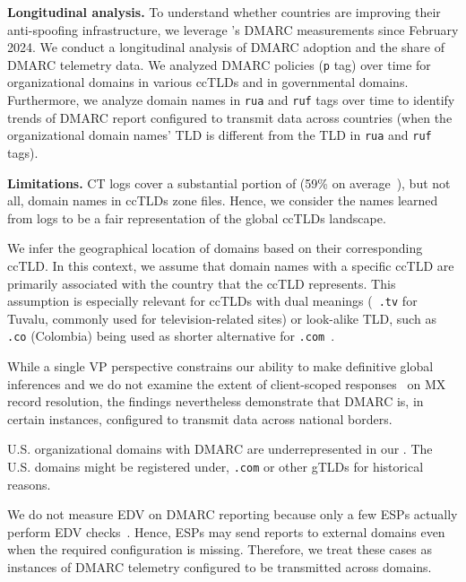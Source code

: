 \textbf{Longitudinal analysis.} To understand whether countries are improving their anti-spoofing infrastructure, we leverage \openintel's \gls{DMARC} measurements since February 2024. We conduct a longitudinal analysis of \gls{DMARC} adoption and the share of \gls{DMARC} telemetry data. We analyzed \gls{DMARC} policies (\texttt{p} tag) over time for organizational domains in various \glspl{ccTLD} and in governmental domains.
Furthermore, we analyze domain names in \texttt{rua} and \texttt{ruf} tags over time to identify trends of \gls{DMARC} report configured to transmit data across countries (when the organizational domain names' \gls{TLD} is different from the \gls{TLD} in \texttt{rua} and \texttt{ruf} tags).

\textbf{Limitations.}
\gls{CT} logs cover a substantial portion of (59\% on average~\cite{SommeseEtAl_ThisLocalDomain_2024a}), but not all, domain names in \glspl{ccTLD} zone files. Hence, we consider the names learned from logs to be a fair representation of the global \glspl{ccTLD} landscape.

We infer the geographical location of domains based on their corresponding \gls{ccTLD}.
In this context, we assume that domain names with a specific \gls{ccTLD} are primarily associated with the country that the \gls{ccTLD} represents. This assumption is especially relevant for \glspl{ccTLD} with dual meanings (\eg~\texttt{.tv} for Tuvalu, commonly used for television-related sites) or look-alike \gls{TLD}, such as \texttt{.co} (Colombia) being used as shorter alternative for \texttt{.com}~\cite{_ManagingMultiRegionalMultilingual_a}.

While a single \gls{VP} perspective constrains our ability to make definitive global inferences and we do not examine the extent of client-scoped responses~\cite{10.1145/3730977} on MX record resolution, the findings nevertheless demonstrate that DMARC is, in certain instances, configured to transmit data across national borders.

U.S. organizational domains with \gls{DMARC} are underrepresented in our \dataset.
The U.S. domains might be registered under, \eg \texttt{.com} or other \glspl{gTLD} for historical reasons.

We do not measure \gls{EDV} on \gls{DMARC} reporting because only a few \glspl{ESP} actually perform \gls{EDV} checks~\cite{hureau_stress_testing}.
Hence, \glspl{ESP} may send reports to external domains even when the required configuration is missing.
Therefore, we treat these cases as instances of \gls{DMARC} telemetry configured to be transmitted across domains.

